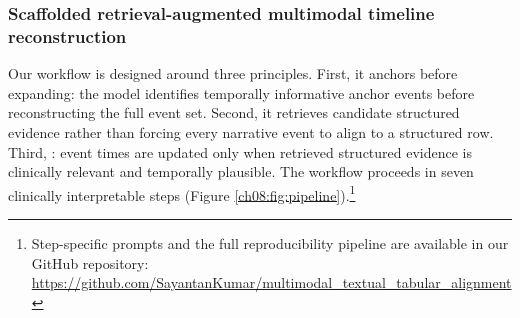 

\subsubsection{Scaffolded retrieval-augmented multimodal timeline reconstruction}
\label{ch08:sec:pipeline}


Our workflow is designed around three principles.
First, it anchors before expanding: the model identifies temporally informative anchor events before reconstructing the full event set.
Second, it retrieves candidate structured evidence rather than forcing every narrative event to align to a structured row.
Third, : event times are updated only when retrieved structured evidence is clinically relevant and temporally plausible.
The workflow proceeds in seven clinically interpretable steps (Figure \ref{ch08:fig:pipeline}).\footnote{Step-specific prompts and the full reproducibility pipeline are available in our GitHub repository:\\\url{https://github.com/SayantanKumar/multimodal_textual_tabular_alignment}}

